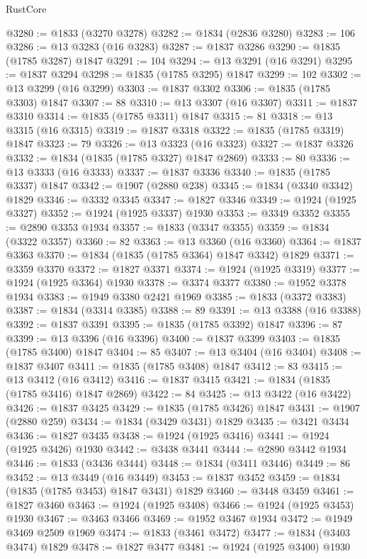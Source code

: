 \begin{lexlean}{RustCore}
\begin{coremodule}
@3280 := @1833 (@3270 @3278)
@3282 := @1834 (@2836 @3280)
@3283 := 106
@3286 := @13 @3283 (@16 @3283)
@3287 := @1837 @3286
@3290 := @1835 (@1785 @3287) @1847
@3291 := 104
@3294 := @13 @3291 (@16 @3291)
@3295 := @1837 @3294
@3298 := @1835 (@1785 @3295) @1847
@3299 := 102
@3302 := @13 @3299 (@16 @3299)
@3303 := @1837 @3302
@3306 := @1835 (@1785 @3303) @1847
@3307 := 88
@3310 := @13 @3307 (@16 @3307)
@3311 := @1837 @3310
@3314 := @1835 (@1785 @3311) @1847
@3315 := 81
@3318 := @13 @3315 (@16 @3315)
@3319 := @1837 @3318
@3322 := @1835 (@1785 @3319) @1847
@3323 := 79
@3326 := @13 @3323 (@16 @3323)
@3327 := @1837 @3326
@3332 := @1834 (@1835 (@1785 @3327) @1847 @2869)
@3333 := 80
@3336 := @13 @3333 (@16 @3333)
@3337 := @1837 @3336
@3340 := @1835 (@1785 @3337) @1847
@3342 := @1907 (@2880 @238)
@3345 := @1834 (@3340 @3342) @1829
@3346 := @3332 @3345
@3347 := @1827 @3346
@3349 := @1924 (@1925 @3327)
@3352 := @1924 (@1925 @3337) @1930
@3353 := @3349 @3352
@3355 := @2890 @3353 @1934
@3357 := @1833 (@3347 @3355)
@3359 := @1834 (@3322 @3357)
@3360 := 82
@3363 := @13 @3360 (@16 @3360)
@3364 := @1837 @3363
@3370 := @1834 (@1835 (@1785 @3364) @1847 @3342) @1829
@3371 := @3359 @3370
@3372 := @1827 @3371
@3374 := @1924 (@1925 @3319)
@3377 := @1924 (@1925 @3364) @1930
@3378 := @3374 @3377
@3380 := @1952 @3378 @1934
@3383 := @1949 @3380 @2421 @1969
@3385 := @1833 (@3372 @3383)
@3387 := @1834 (@3314 @3385)
@3388 := 89
@3391 := @13 @3388 (@16 @3388)
@3392 := @1837 @3391
@3395 := @1835 (@1785 @3392) @1847
@3396 := 87
@3399 := @13 @3396 (@16 @3396)
@3400 := @1837 @3399
@3403 := @1835 (@1785 @3400) @1847
@3404 := 85
@3407 := @13 @3404 (@16 @3404)
@3408 := @1837 @3407
@3411 := @1835 (@1785 @3408) @1847
@3412 := 83
@3415 := @13 @3412 (@16 @3412)
@3416 := @1837 @3415
@3421 := @1834 (@1835 (@1785 @3416) @1847 @2869)
@3422 := 84
@3425 := @13 @3422 (@16 @3422)
@3426 := @1837 @3425
@3429 := @1835 (@1785 @3426) @1847
@3431 := @1907 (@2880 @259)
@3434 := @1834 (@3429 @3431) @1829
@3435 := @3421 @3434
@3436 := @1827 @3435
@3438 := @1924 (@1925 @3416)
@3441 := @1924 (@1925 @3426) @1930
@3442 := @3438 @3441
@3444 := @2890 @3442 @1934
@3446 := @1833 (@3436 @3444)
@3448 := @1834 (@3411 @3446)
@3449 := 86
@3452 := @13 @3449 (@16 @3449)
@3453 := @1837 @3452
@3459 := @1834 (@1835 (@1785 @3453) @1847 @3431) @1829
@3460 := @3448 @3459
@3461 := @1827 @3460
@3463 := @1924 (@1925 @3408)
@3466 := @1924 (@1925 @3453) @1930
@3467 := @3463 @3466
@3469 := @1952 @3467 @1934
@3472 := @1949 @3469 @2509 @1969
@3474 := @1833 (@3461 @3472)
@3477 := @1834 (@3403 @3474) @1829
@3478 := @1827 @3477
@3481 := @1924 (@1925 @3400) @1930

\end{coremodule}
\end{lexlean}
